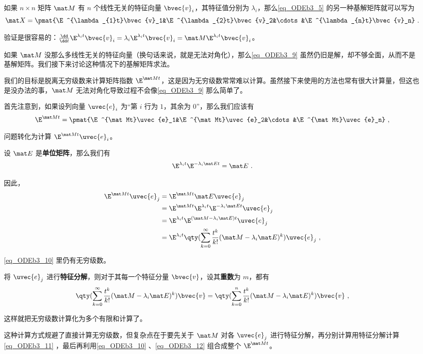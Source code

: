 如果 $n\times n$ 矩阵 $\mat M$ 有 $n$ 个线性无关的特征向量 $\bvec{v}_i$，其特征值分别为 $\lambda_i$，那么\autoref{eq_ODEb3_5} 的另一种基解矩阵就可以写为
\begin{equation}\label{eq_ODEb3_9}
\mat X=\pmat{\E^{\lambda_{1}t}\bvec{v}_1&\E^{\lambda_{2}t}\bvec{v}_2&\cdots&\E^{\lambda_{n}t}\bvec{v}_n}~.
\end{equation}

验证是很容易的：$\frac{\dd}{\dd t}\E^{\lambda_{i}t}\bvec{v}_i=\lambda_i\E^{\lambda_{i}t}\bvec{v}_i=\mat M\E^{\lambda_{i}t}\bvec{v}_i$。

如果 $\mat M$ 没那么多线性无关的特征向量（换句话来说，就是无法对角化），那么\autoref{eq_ODEb3_9} 虽然仍旧是解，却不够全面，从而不是基解矩阵。我们接下来讨论这种情况下的基解矩阵求法。

我们的目标是脱离无穷级数来计算矩阵指数 $\E^{\mat Mt}$，这是因为无穷级数常常难以计算。虽然接下来使用的方法也常有很大计算量，但这也是没办法的事，$\mat M$ 无法对角化导致过程不会像\autoref{eq_ODEb3_9} 那么简单了。

首先注意到，如果设列向量 $\uvec{e}_i$ 为“第 $i$ 行为 $1$，其余为 $0$”，那么我们应该有
\begin{equation}\label{eq_ODEb3_12}
\E^{\mat Mt}=\pmat{\E^{\mat Mt}\uvec{e}_1&\E^{\mat Mt}\uvec{e}_2&\cdots&\E^{\mat Mt}\uvec{e}_n}~,
\end{equation}

问题转化为计算 $\E^{\mat Mt}\uvec{e}_i$。

设 $\mat E$ 是\textbf{单位矩阵}，那么我们有
\begin{equation}
\E^{\lambda_it}\E^{-\lambda_i\mat Et}=\mat E~.
\end{equation}

因此，
\begin{equation}\label{eq_ODEb3_10}
\begin{aligned}
\E^{\mat Mt}\uvec{e}_j&=\E^{\mat Mt}\mat E\uvec{e}_j\\
&=\E^{\mat Mt}\E^{\lambda_it}\E^{-\lambda_i\mat Et}\uvec{e}_j\\
&=\E^{\lambda_it}\E^{(\mat M-\lambda_i\mat E)t}\uvec{e}_j\\
&=\E^{\lambda_it}\qty(\sum_{k=0}^\infty \frac{t^k}{k!}(\mat M-\lambda_i\mat E)^k)\uvec{e}_j~,
\end{aligned}
\end{equation}

\autoref{eq_ODEb3_10} 里仍有无穷级数。

将 $\uvec{e}_j$ 进行\textbf{特征分解}，则对于其每一个特征分量 $\bvec{v}$，设其\textbf{重数}为 $m$，都有
\begin{equation}\label{eq_ODEb3_11}
\qty(\sum_{k=0}^\infty \frac{t^k}{k!}(\mat M-\lambda_i\mat E)^k)\bvec{v}=\qty(\sum_{k=0}^n \frac{t^k}{k!}(\mat M-\lambda_i\mat E)^k)\bvec{v}~,
\end{equation}

这样就把无穷级数计算化为多个有限和计算了。

这种计算方式规避了直接计算无穷级数，但复杂点在于要先关于 $\mat M$ 对各 $\uvec{e}_j$ 进行特征分解，再分别计算用特征分解计算\autoref{eq_ODEb3_11} ，最后再利用\autoref{eq_ODEb3_10} 、\autoref{eq_ODEb3_12} 组合成整个 $\E^{\mat Mt}$。









